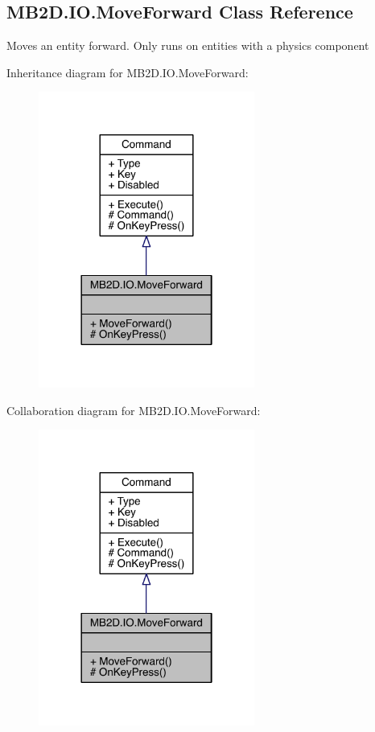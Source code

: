 \hypertarget{class_m_b2_d_1_1_i_o_1_1_move_forward}{}\subsection{M\+B2\+D.\+I\+O.\+Move\+Forward Class Reference}
\label{class_m_b2_d_1_1_i_o_1_1_move_forward}


Moves an entity forward. Only runs on entities with a physics component  




Inheritance diagram for M\+B2\+D.\+I\+O.\+Move\+Forward\+:
\nopagebreak
\begin{figure}[H]
\begin{center}
\leavevmode
\includegraphics[width=201pt]{class_m_b2_d_1_1_i_o_1_1_move_forward__inherit__graph}
\end{center}
\end{figure}


Collaboration diagram for M\+B2\+D.\+I\+O.\+Move\+Forward\+:
\nopagebreak
\begin{figure}[H]
\begin{center}
\leavevmode
\includegraphics[width=201pt]{class_m_b2_d_1_1_i_o_1_1_move_forward__coll__graph}
\end{center}
\end{figure}
